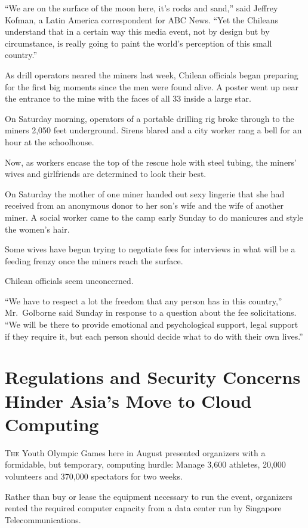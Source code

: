 ﻿\documentclass[12pt]{article}
\begin{document}
``We are on the surface of the moon here, it's rocks and sand,'' said Jeffrey Kofman, a Latin
America correspondent for ABC News. ``Yet the Chileans understand that in a certain way this media
event, not by design but by circumstance, is really going to paint the world's perception of this
small country.''

As drill operators neared the miners last week, Chilean officials began preparing for the first big
moments since the men were found alive. A poster went up near the entrance to the mine with the
faces of all 33 inside a large star.

On Saturday morning, operators of a portable drilling rig broke through to the miners 2,050 feet
underground. Sirens blared and a city worker rang a bell for an hour at the schoolhouse.

Now, as workers encase the top of the rescue hole with steel tubing, the miners' wives and
girlfriends are determined to look their best.

On Saturday the mother of one miner handed out sexy lingerie that she had received from an anonymous
donor to her son's wife and the wife of another miner. A social worker came to the camp early Sunday
to do manicures and style the women's hair.

Some wives have begun trying to negotiate fees for interviews in what will be a feeding frenzy once
the miners reach the surface.

Chilean officials seem unconcerned.

``We have to respect a lot the freedom that any person has in this country,'' Mr.~Golborne said
Sunday in response to a question about the fee solicitations. ``We will be there to provide
emotional and psychological support, legal support if they require it, but each person should decide
what to do with their own lives.''

\section{Regulations and Security Concerns Hinder Asia's Move to Cloud Computing}

\lettrine{T}{he} Youth Olympic Games here in August presented organizers
with a formidable, but temporary, computing hurdle: Manage 3,600 athletes, 20,000 volunteers and
370,000 spectators for two weeks.

Rather than buy or lease the equipment necessary to run the event, organizers rented the required
computer capacity from a data center run by Singapore Telecommunications.
\end{document}
